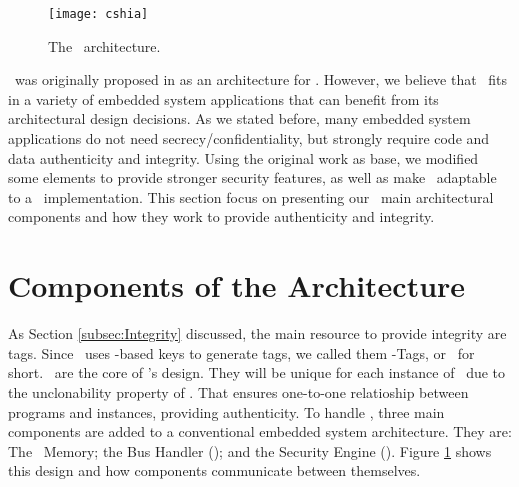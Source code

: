 

\begin{figure}[!ht]
	\centering
	\texttt{[image: cshia]}
	\caption{The \cshia~architecture.}
	\label{fig:cshia}
\end{figure}

\cshia~was originally proposed in \cite{Hoffman2015} as an architecture for \iot. However, we believe that \cshia~fits in a variety of embedded system applications that can benefit from its architectural design decisions. As we stated before, many embedded system applications do not need secrecy\slash{}confidentiality, but strongly require code and data authenticity and integrity. Using the original work as base, we modified some elements to provide stronger security features, as well as make \cshia~adaptable to a \fpga~implementation. This section focus on presenting our \cshia~main architectural components and how they work to provide authenticity and integrity.

\section{Components of the Architecture}
\label{sec:Components-of-the-Architecture}

As Section \ref{subsec:Integrity} discussed, the main resource to provide integrity are tags. Since \cshia~uses \puf-based keys to generate tags, we called them \puf-Tags, or \ptags~for short. \ptags~are the core of \cshia's design. They will be unique for each instance of \cshia~due to the unclonability property of \pufs. That ensures one-to-one relatioship between programs and instances, providing authenticity. To handle \ptags, three main components are added to a conventional embedded system architecture. They are: The \ptag~Memory; the Bus Handler (\handler); and the Security Engine (\seceng). Figure \ref{fig:cshia} shows this design and how components communicate between themselves. 

